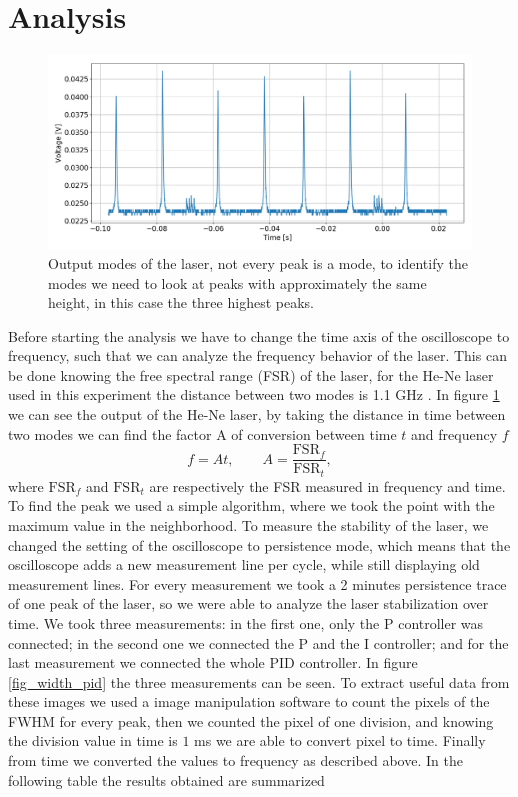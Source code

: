 \documentclass[a4paper,10pt]{article}
\begin{document}
\section{Analysis}
\begin{figure}[H]
\centering
\includegraphics[width=\textwidth]{laser}
\caption{Output modes of the laser, not every peak is a mode, to identify the modes we need to look at peaks with approximately the same height, in this case the three highest peaks.}\label{laser}
\end{figure}
Before starting the analysis we have to change the time axis of the oscilloscope to frequency, such that we can analyze the frequency behavior of the laser. This can be done knowing the free spectral range (FSR) of the laser, for the He-Ne laser used in this experiment the distance between two modes is 1.1 GHz \cite{script}. In figure \ref{laser} we can see the output of the He-Ne laser, by taking the distance in time between two modes we can find the factor A of conversion between time $t$ and frequency $f$
\[f = At, \qquad A = \frac{\text{FSR}_f}{\text{FSR}_t},\]
where $\text{FSR}_f$ and $\text{FSR}_t$ are respectively the FSR measured in frequency and time. To find the peak we used a simple algorithm, where we took the point with the maximum value in the neighborhood.
To measure the stability of the laser, we changed the setting of the oscilloscope to persistence mode, which means that the oscilloscope adds a new measurement line per cycle, while still displaying old measurement lines. For every measurement we took a 2 minutes persistence trace of one peak of the laser, so we were able to analyze the laser stabilization over time. We took three measurements: in the first one, only the P controller was connected; in the second one we connected the P and the I controller; and for the last measurement we connected the whole PID controller. In figure \ref{fig_width_pid} the three measurements can be seen. To extract useful data from these images we used a image manipulation software to count the pixels of the FWHM for every peak, then we counted the pixel of one division, and knowing the division value in time is $1$ ms we are able to convert pixel to time. Finally from time we converted the values to frequency as described above. In the following table the results obtained are summarized
\end{document}
